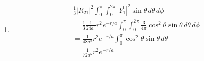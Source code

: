 \documentclass{article}
\begin{document}
\begin{enumerate}
  \item

        \begin{align*}
           & \frac{1}{3} |R_{2 1}|^2 \int_0^\pi \int_0^{2 \pi} |Y_1^0|^2 \sin \theta \,d \theta \,d \phi                                           \\
           & = \frac{1}{3} \frac{1}{24 a^5} r^2 e^{-r / a} \int_0^\pi \int_0^{2 \pi} \frac{3}{4 \pi} \cos^2 \theta \sin \theta \,d \theta \,d \phi \\
           & = \frac{1}{48 a^5} r^2 e^{-r / a} \int_0^\pi \cos^2 \theta \sin \theta \,d \theta                                                     \\
           & = \frac{1}{72 a^5} r^2 e^{-r / a}
        \end{align*}
\end{enumerate}

\setcounter{subsection}{69}
\subsection{}
\end{document}
